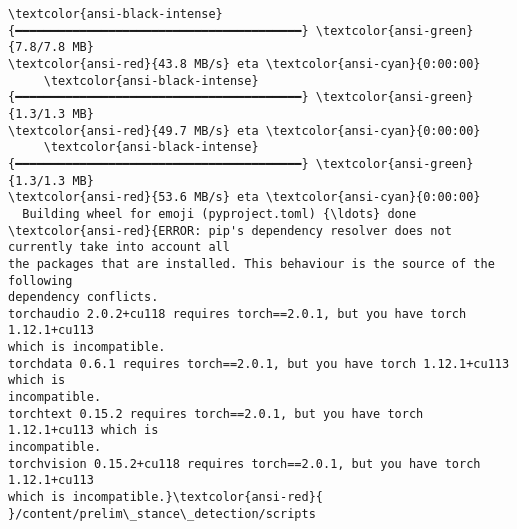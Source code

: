 \documentclass[11pt]{article}
\begin{document}
\begin{Verbatim}[commandchars=\\\{\}]
     \textcolor{ansi-black-intense}{━━━━━━━━━━━━━━━━━━━━━━━━━━━━━━━━━━━━━━━━} \textcolor{ansi-green}{7.8/7.8 MB}
\textcolor{ansi-red}{43.8 MB/s} eta \textcolor{ansi-cyan}{0:00:00}
     \textcolor{ansi-black-intense}{━━━━━━━━━━━━━━━━━━━━━━━━━━━━━━━━━━━━━━━━} \textcolor{ansi-green}{1.3/1.3 MB}
\textcolor{ansi-red}{49.7 MB/s} eta \textcolor{ansi-cyan}{0:00:00}
     \textcolor{ansi-black-intense}{━━━━━━━━━━━━━━━━━━━━━━━━━━━━━━━━━━━━━━━━} \textcolor{ansi-green}{1.3/1.3 MB}
\textcolor{ansi-red}{53.6 MB/s} eta \textcolor{ansi-cyan}{0:00:00}
  Building wheel for emoji (pyproject.toml) {\ldots} done
\textcolor{ansi-red}{ERROR: pip's dependency resolver does not currently take into account all
the packages that are installed. This behaviour is the source of the following
dependency conflicts.
torchaudio 2.0.2+cu118 requires torch==2.0.1, but you have torch 1.12.1+cu113
which is incompatible.
torchdata 0.6.1 requires torch==2.0.1, but you have torch 1.12.1+cu113 which is
incompatible.
torchtext 0.15.2 requires torch==2.0.1, but you have torch 1.12.1+cu113 which is
incompatible.
torchvision 0.15.2+cu118 requires torch==2.0.1, but you have torch 1.12.1+cu113
which is incompatible.}\textcolor{ansi-red}{
}/content/prelim\_stance\_detection/scripts
    \end{Verbatim}
\end{document}
